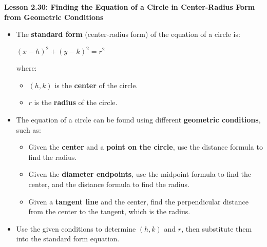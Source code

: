 \begin{center}
\textbf{Lesson 2.30: Finding the Equation of a Circle in Center-Radius Form from Geometric Conditions}
\end{center}

\vspace*{-1.5ex}

\begin{itemize}
    \item The \textbf{standard form} (center-radius form) of the equation of a circle is:

{\centering $
    (x - h)^2 + (y - k)^2 = r^2
$\par}
    where:
    \begin{itemize}
        \item $(h, k)$ is the \textbf{center} of the circle.
        \item $r$ is the \textbf{radius} of the circle.
    \end{itemize}
    \item The equation of a circle can be found using different \textbf{geometric conditions}, such as:
    \begin{itemize}
        \item Given the \textbf{center} and a \textbf{point on the circle}, use the distance formula to find the radius.
        \item Given the \textbf{diameter endpoints}, use the midpoint formula to find the center, and the distance formula to find the radius.
        \item Given a \textbf{tangent line} and the center, find the perpendicular distance from the center to the tangent, which is the radius.
    \end{itemize}
    \item Use the given conditions to determine $(h, k)$ and $r$, then substitute them into the standard form equation.
\end{itemize}
